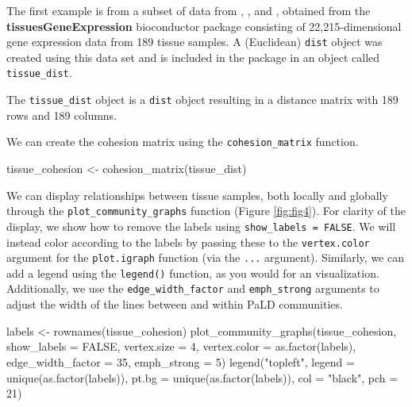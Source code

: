 The first example is from a subset of data from \citet{zilliox2007gene},
\citet{mccall2011gene}, and \citet{mccall2014gene}, obtained from the
\textbf{tissuesGeneExpression} bioconductor package \citep{tissue}
consisting of 22,215-dimensional gene expression data from 189 tissue
samples. A (Euclidean) \texttt{dist} object was created using this data
set and is included in the  package in an object called
\texttt{tissue\_dist}.

The \texttt{tissue\_dist} object is a \texttt{dist} object resulting in
a distance matrix with 189 rows and 189 columns.

We can create the cohesion matrix using the \texttt{cohesion\_matrix}
function.

\begin{Schunk}
\begin{Sinput}
tissue_cohesion <- cohesion_matrix(tissue_dist)
\end{Sinput}
\end{Schunk}

We can display relationships between tissue samples, both locally and
globally through the \texttt{plot\_community\_graphs} function (Figure
\ref{fig:fig4}). For clarity of the display, we show how to remove the
labels using \texttt{show\_labels\ =\ FALSE}. We will instead color
according to the labels by passing these to the \texttt{vertex.color}
argument for the \texttt{plot.igraph} function (via the \texttt{...}
argument). Similarly, we can add a legend using the \texttt{legend()}
function, as you would for an  visualization.
Additionally, we use the \texttt{edge\_width\_factor} and
\texttt{emph\_strong} arguments to adjust the width of the lines between
and within PaLD communities.

\begin{Schunk}
\begin{Sinput}
labels <- rownames(tissue_cohesion)
plot_community_graphs(tissue_cohesion,
                      show_labels = FALSE,
                      vertex.size = 4,
                      vertex.color = as.factor(labels),
                      edge_width_factor = 35,
                      emph_strong = 5) 
legend("topleft", 
       legend = unique(as.factor(labels)), 
       pt.bg = unique(as.factor(labels)),
       col = "black",
       pch = 21)
\end{Sinput}
\end{Schunk}

